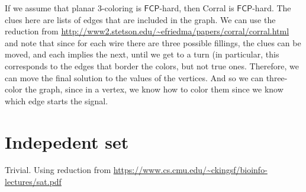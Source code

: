 \documentclass[runningheads,a4paper]{llncs}
\begin{document}
If we assume that planar 3-coloring is $\mathsf{FCP}$-hard, then Corral is $\mathsf{FCP}$-hard. The clues here are lists of edges that are included in the graph. We can use the reduction from \url{http://www2.stetson.edu/~efriedma/papers/corral/corral.html} and note that since for each wire there are three possible fillings, the clues can be moved, and each implies the next, until we get to a turn (in particular, this corresponds to the edges that border the colors, but not true ones. Therefore, we can move the final solution to the values of the vertices. And so we can  three-color the graph, since in a vertex, we know how to color them since we know which edge starts the signal.

\section{Indepedent set}

Trivial. Using reduction from \url{https://www.cs.cmu.edu/~ckingsf/bioinfo-lectures/sat.pdf}
\end{document}
